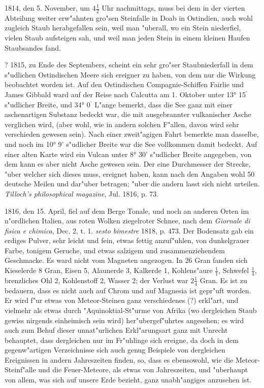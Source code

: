 \documentclass[a4paper, 11pt, oneside, polutonikogreek, german]{article}
\begin{document}
1814, den 5. November, um $\mathfrak{4\frac{1}{2}}$ Uhr nachmittags, muss bei dem in der vierten Abteilung weiter erw"ahnten gro"sen Steinfalle in Doab in Ostindien, auch wohl zugleich Staub herabgefallen sein, weil man "uberall, wo ein Stein niederfiel, vielen Staub aufsteigen sah, und weil man jeden Stein in einem kleinen Haufen Staubsandes fand.

? 1815, zu Ende des Septembers, scheint ein sehr gro"ser Staubniederfall in dem s"udlichen Ostindischen Meere sich ereigner zu haben, von dem nur die Wirkung beobachtet worden ist. Auf den Ostindischen Compagnie-Schiffen Fairlie und James Gibbald ward auf der Reise nach Calcutta am 1. Oktober unter 13° 15$^{\prime}$ s"udlicher Breite, und 34° 0$^{\prime}$ L"ange bemerkt, dass die See ganz mit einer aschenartigen Substanz bedeckt war, die mit ausgebrannter vulkanischer Asche verglichen wird, (aber wohl, wie in andern solchen F"allen, davon wird sehr verschieden gewesen sein). Nach einer zweit"agigen Fahrt bemerkte man dasselbe, und noch im 10° 9' s"udlicher Breite war die See vollkommen damit bedeckt. Auf einer alten Karte wird ein Vulcan unter 8° 30' s"udlicher Breite angegeben, von dem kann es aber nicht Asche gewesen sein. Der eine Durchmesser der Strecke, "uber welcher sich dieses muss, ereignet haben, kann nach den Angaben wohl 50 deutsche Meilen und dar"uber betragen; "uber die andern lasst sich nicht urteilen. \emph{Tilloch's philosophical magazine}, Jul. 1816, p. 73.

1816, den 15. April, fiel auf dem Berge Tonale, und noch an anderen Orten im n"ordlichen Italien, aus roten Wolken ziegelroter Schnee, nach dem \emph{Giornale di fisica e chimica}, Dec. 2, t. 1. \emph{sesto bimestre} 1818, p. 473. Der Bodensatz gab ein erdiges Pulver, sehr leicht und fein, etwas fettig anzuf"uhlen, von dunkelgrauer Farbe, tonigem Geruche, und etwas salzigem und zusammenziehendem Geschmacke. Es ward nicht vom Magneten angezogen. In 26 Gran fanden sich Kieselerde 8 Gran, Eisen 5, Alaunerde 3, Kalkerde 1, Kohlens"aure $\mathfrak{\frac{1}{1}}$, Schwefel $\mathfrak{\frac{1}{4}}$, brenzliches Ohl 2, Kohlenstoff 2, Wasser 2; der Verlust war $\mathfrak{2\frac{1}{4}}$ Gran. Es ist zu bedauern, dass es nicht auch auf Chrom und auf Magnesia ist gepr"uft worden. Er wird f"ur etwas von Meteor-Steinen ganz verschiedenes (?) erkl"art, und vielmehr als etwas durch "Aquinoktial-St"urme von Afrika (wo dergleichen Staub gewiss nirgends einheimisch sein wird) her"ubergef"uhrtes angesehen; es wird auch zum Behuf dieser unnat"urlichen Erkl"arungsart ganz mit Unrecht behauptet, dass dergleichen nur im Fr"uhlinge sich ereigne, da doch in dem gegenw"artigen Verzeichnisse sich auch genug Beispiele von dergleichen Ereignissen in andern Jahreszeiten finden, so, dass es ebensowohl, wie die Meteor-Steinf"alle und die Feuer-Meteore, als etwas von Jahreszeiten, und "uberhaupt von allem, was sich auf unsere Erde bezieht, ganz unabh"angiges anzusehen ist.
\end{document}
